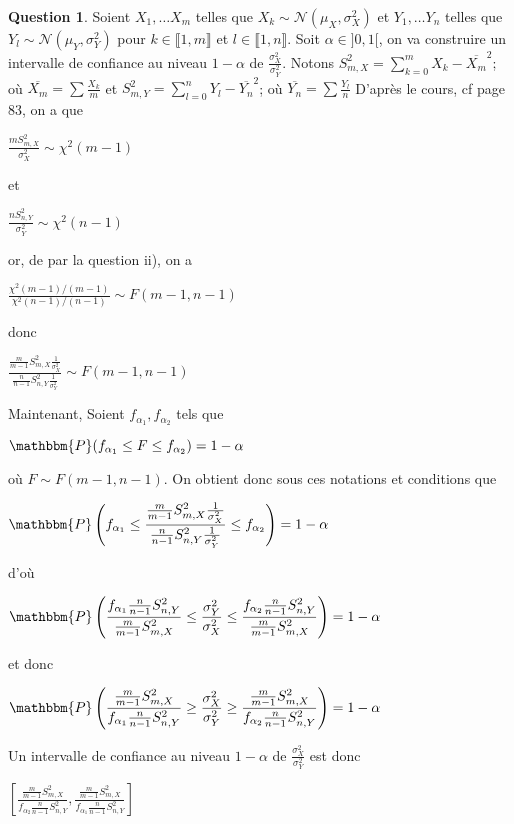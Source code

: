 \documentclass[12pt]{article}
\newcommand{\1}{\mathbbm{1}}
\newcommand{\Prob}{\mathbbm{P}}
\newcommand{\Nc}{\mathcal{N}}
\theoremstyle{definition}\newtheorem{defn}{Définition}
\theoremstyle{definition}\newtheorem{exm}{Exemple}
\theoremstyle{definition}\newtheorem{rem}{Remarque}
\theoremstyle{definition}\newtheorem{algo}{Algorithme}
\theoremstyle{remark}\newtheorem{exo}{Exercice}
\theoremstyle{remark}\newtheorem{nota}{Notation}
\theoremstyle{definition}\newtheorem{1q}{Question}
\theoremstyle{definition}\newtheorem{2q}{Question}
\theoremstyle{definition}\newtheorem{3q}{Question}
\theoremstyle{definition}\newtheorem{4q}{Question}
\theoremstyle{definition}\newtheorem{2qs1}{}
\theoremstyle{definition}\newtheorem{2qs2}{}
\theoremstyle{definition}\newtheorem{2qs3}{}
\theoremstyle{definition}\newtheorem{2qs4}{}
\theoremstyle{definition}\newtheorem{4qs2}{}
\theoremstyle{definition}\newtheorem{4qs3}{}
\begin{document}
\begin{3q}
Soient $X_1, \ldots X_m$ telles que $X_k \sim \Nc(\mu_X, \sigma_X^2)$ et $Y_1, \ldots Y_n$ telles que $Y_l \sim \Nc(\mu_Y, \sigma_Y^2)$ pour $k\in\llbracket1,m\rrbracket$ et $l\in\llbracket1,n\rrbracket$. \newline
Soit $\alpha \in ]0,1[$, on va construire un intervalle de confiance au niveau $1-\alpha$ de $\frac{\sigma_X^2}{\sigma_Y^2}$.\newline
Notons $S_{m,X}^2 = \displaystyle\sum_{k=0}^m X_k - \overline{X_m}^2$; où $\overline{X_m} = \displaystyle\sum\frac{X_k}{m}$ et\newline
$S_{m,Y}^2 = \displaystyle\sum_{l=0}^n Y_l - \overline{Y_n}^2$; où $\overline{Y_n} = \displaystyle\sum\frac{Y_l}{n}$\newline
D'après le cours, cf page 83, on a que 
\begin{center} $\displaystyle\frac{mS_{m,X}^2}{\sigma_X^2}\sim\chi^2(m-1)$\end{center}
et
\begin{center} $\displaystyle\frac{nS_{n,Y}^2}{\sigma_Y^2}\sim\chi^2(n-1)$\end{center}
or, de par la question ii), on a 
\begin{center} $\displaystyle\frac{\chi^2(m-1)/(m-1)}{\chi^2(n-1)/(n-1)}\sim F(m-1, n-1)$\end{center}
donc 
\begin{center}$\displaystyle\frac{\frac{m}{m-1}S_{m,X}^2\frac{1}{\sigma_X^2}}{\frac{n}{n-1}S_{n,Y}^2\frac{1}{\sigma_Y^2}}\sim F(m-1,n-1)$\end{center}
Maintenant, \newline
Soient $f_{\alpha_1}, f_{\alpha_2}$ tels que 
\begin{center}$\Prob(f_{\alpha_1}\le F \le f_{\alpha_2})=1-\alpha$\end{center}
où $F\sim F(m-1, n-1)$. On obtient donc sous ces notations et conditions que 
\begin{center}$\Prob\left(f_{\alpha_1}\le \displaystyle\frac{\frac{m}{m-1}S_{m,X}^2\frac{1}{\sigma_X^2}}{\frac{n}{n-1}S_{n,Y}^2\frac{1}{\sigma_Y^2}} \le f_{\alpha_2}\right) = 1-\alpha$ \end{center}
d'où
\begin{center} $\displaystyle\Prob\left(\frac{f_{\alpha_1}\frac{n}{n-1}S_{n,Y}^2}{\frac{m}{m-1}S_{m,X}^2} \le \frac{\sigma_Y^2}{\sigma_X^2}\le \frac{f_{\alpha_2}\frac{n}{n-1}S_{n,Y}^2}{\frac{m}{m-1}S_{m,X}^2} \right) = 1-\alpha$ \end{center}
et donc
\begin{center} $\displaystyle\Prob\left(\frac{\frac{m}{m-1}S_{m,X}^2}{f_{\alpha_1}\frac{n}{n-1}S_{n,Y}^2} \ge \frac{\sigma_X^2}{\sigma_Y^2}\ge \frac{\frac{m}{m-1}S_{m,X}^2}{f_{\alpha_2}\frac{n}{n-1}S_{n,Y}^2} \right) = 1-\alpha$ \end{center}
Un intervalle de confiance au niveau $1-\alpha$ de $\displaystyle \frac{\sigma_X^2}{\sigma_Y^2}$ est donc 
\begin{center} $\displaystyle\left[\frac{\frac{m}{m-1}S_{m,X}^2}{f_{\alpha_2}\frac{n}{n-1}S_{n,Y}^2}, \frac{\frac{m}{m-1}S_{m,X}^2}{f_{\alpha_1}\frac{n}{n-1}S_{n,Y}^2}\right]$\end{center}
\end{3q}
\end{document}
